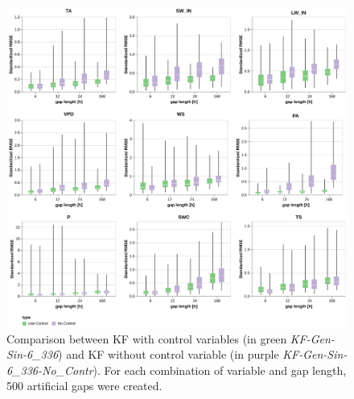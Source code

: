 \documentclass{article}
\newcommand{\imgwidth}{6in}
\begin{document}



\begin{figure}
\centerline{\includegraphics[width=\imgwidth]{images2/use_control.png}}
\caption{Comparison between KF with control variables (in green \textit{KF-Gen-Sin-6\_336}) and KF without control variable (in purple \textit{KF-Gen-Sin-6\_336-No\_Contr}). For each combination of variable and gap length, 500 artificial gaps were created.}
\label{fig:control}
\end{figure}
\end{document}
